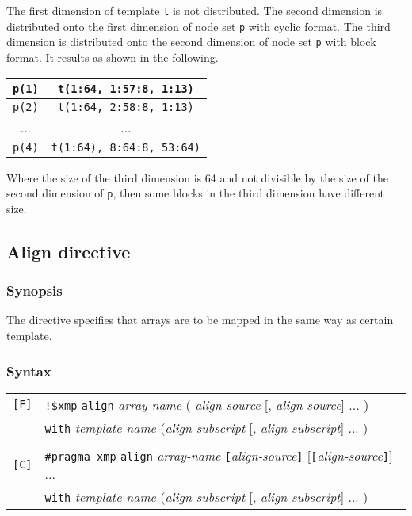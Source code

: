 \begin{description}
The first dimension of template
{\tt t} is not distributed. The second dimension is distributed onto the
first dimension of node set {\tt p} with cyclic format. The third
dimension is distributed onto the second dimension of node set {\tt p}
with block format. It results as shown in the following. 

\begin{center}
\begin{tabular}{|c|c|}
\hline
{\tt p(1)} & {\tt t(1:64, 1:57:8, 1:13)} \\
\hline
{\tt p(2)} & {\tt t(1:64, 2:58:8, 1:13)} \\
\hline
... & ... \\
\hline
{\tt p(4)} & {\tt t(1:64), 8:64:8, 53:64)} \\
\hline
\end{tabular}
\end{center}

Where the size of the third dimension is 64 and not divisible by the
size of the second dimension of {\tt p}, then some blocks in the third
dimension have different size. 

\end{description}

\subsection{Align directive}
\subsubsection*{Synopsis}
The {\tt {}} directive specifies that arrays are to be mapped in
the same way as certain template.

\subsubsection*{Syntax}

\begin{tabular}{ll}
\verb![F]! & \verb|!$xmp| {\tt align} {\it array-name}
( {\it align-source} [, {\it align-source}] ... ) \\
 & {\tt with} {\it template-name}
({\it align-subscript} [, {\it align-subscript}] ... ) \\
& \\
\verb![C]! & \verb|#pragma xmp| {\tt align} {\it array-name} 
{\tt [}{\it align-source}{\tt ]} [{\tt [}{\it align-source}{\tt ]}] ... \\
 & {\tt with} {\it template-name}
({\it align-subscript} [, {\it align-subscript}] ... ) \\
\end{tabular}
\vspace{0.3cm}

